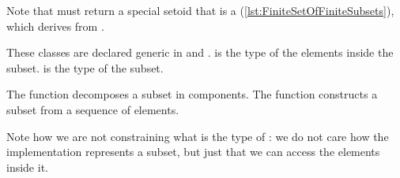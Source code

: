 \label{sec:power-set-exercise}



Note that  must return a special setoid that is a  (\cref{lst:FiniteSetOfFiniteSubsets}), which derives from .


These classes are declared generic in  and .
 is the type of the elements inside the subset.
 is the type of the subset.

The function  decomposes a subset in components.
The function  constructs a subset from a sequence of elements.

Note how we are not constraining what is the type of : we do not care how the implementation represents a subset, but just that we can access the elements inside it.
